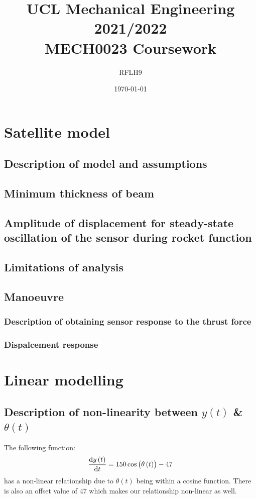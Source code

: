 \documentclass[11pt]{article}
\numberwithin{equation}{section}
\begin{document}
\title{\textbf{UCL Mechanical Engineering 2021/2022}\\MECH0023 Coursework}
\author{RFLH9}
\date{\today}
\maketitle
\tableofcontents
\listoffigures
\section{Satellite model}
\subsection{Description of model and assumptions}
\subsection{Minimum thickness of beam}
\subsection{Amplitude of displacement for steady-state oscillation of the sensor during rocket function}
\subsection{Limitations of analysis}
\subsection{Manoeuvre}
\subsubsection{Description of obtaining sensor response to the thrust force}
\subsubsection{Dispalcement response}
\section{Linear modelling}
\subsection{Description of non-linearity between $y(t)$ \& $\theta(t)$}
The following function:
\begin{equation}
    \frac{\dif y\left( t\right)}{\dif t} = 150 \cos \left(\theta\left(t\right)\right) - 47
\end{equation}
has a non-linear relationship due to $\theta(t)$ being within a cosine function. There is also an offset value of $47$ which makes our relationship non-linear as well.
\end{document}
